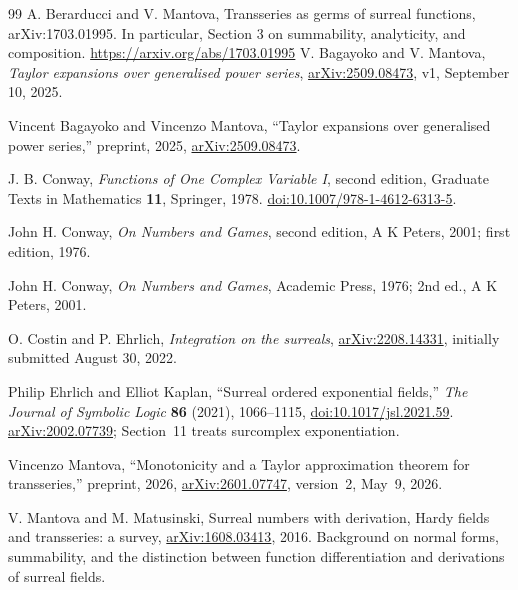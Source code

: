 \documentclass[11pt,a4paper]{article}
\numberwithin{equation}{section}
\theoremstyle{definition}
\theoremstyle{remark}
\theoremstyle{plain}
\newcommand{\arxiv}[1]{\href{https://arxiv.org/abs/#1}{arXiv:#1}}
\begin{document}
\begin{thebibliography}{99}
A. Berarducci and V. Mantova, Transseries as germs of surreal functions, arXiv:1703.01995. In particular, Section 3 on summability, analyticity, and composition. \url{https://arxiv.org/abs/1703.01995}
V. Bagayoko and V. Mantova, \emph{Taylor expansions over generalised power series}, \arxiv{2509.08473}, v1, September 10, 2025.

Vincent Bagayoko and Vincenzo Mantova, ``Taylor expansions over generalised power series,'' preprint, 2025, \href{https://arxiv.org/abs/2509.08473}{arXiv:2509.08473}.

J. B. Conway, \emph{Functions of One Complex Variable I}, second edition, Graduate Texts in Mathematics \textbf{11}, Springer, 1978. \href{https://doi.org/10.1007/978-1-4612-6313-5}{doi:10.1007/978-1-4612-6313-5}.

John H. Conway, \emph{On Numbers and Games}, second edition, A K Peters, 2001; first edition, 1976.

John H. Conway, \emph{On Numbers and Games}, Academic Press, 1976; 2nd ed., A K Peters, 2001.

O. Costin and P. Ehrlich, \emph{Integration on the surreals}, \arxiv{2208.14331}, initially submitted August 30, 2022.

Philip Ehrlich and Elliot Kaplan, ``Surreal ordered exponential fields,'' \emph{The Journal of Symbolic Logic} \textbf{86} (2021), 1066--1115, \href{https://doi.org/10.1017/jsl.2021.59}{doi:10.1017/jsl.2021.59}. \href{https://arxiv.org/abs/2002.07739}{arXiv:2002.07739}; Section~11 treats surcomplex exponentiation.

Vincenzo Mantova, ``Monotonicity and a Taylor approximation theorem for transseries,'' preprint, 2026, \href{https://arxiv.org/abs/2601.07747}{arXiv:2601.07747}, version~2, May~9, 2026.

V. Mantova and M. Matusinski, Surreal numbers with derivation, Hardy fields and transseries: a survey, \href{https://arxiv.org/abs/1608.03413}{arXiv:1608.03413}, 2016. Background on normal forms, summability, and the distinction between function differentiation and derivations of surreal fields.


\end{thebibliography}
\end{document}
